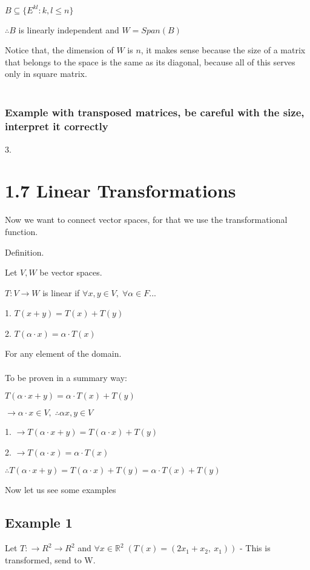 \documentclass{article}
\begin{document}
\(B \subseteq \{E^{kl} : k,l \leq n\}\)

\(\therefore B\) is linearly independent and \(W =Span(B)\)

Notice that, the dimension of \(W\) is \(n\), it makes sense because the size of a matrix that belongs to the space is the same as its diagonal, because all of this serves only in square matrix.
\\
\\
\subsubsection*{Example with transposed matrices, be careful with the size, interpret it correctly}
3. 


\section*{1.7 Linear Transformations}
Now we want to connect vector spaces, for that we use the transformational function.

Definition. 

Let \(V, W\) be vector spaces.

\(T:V\rightarrow W\) is linear if \(\forall x,y \in V,\;\forall\alpha \in F\)...

1. \(T(x+y) = T(x) + T(y)\)

2. \(T(\alpha\cdot x) = \alpha \cdot T(x)\)

For any element of the domain.
\\
\\
To be proven in a summary way:

\(T(\alpha \cdot x + y) = \alpha \cdot T(x) + T(y)\)

\(\rightarrow \alpha \cdot x \in V,\; \therefore \alpha x, y \in V\)

1. \(\rightarrow T(\alpha \cdot x + y) = T(\alpha \cdot x) + T(y)\)

2. \(\rightarrow T(\alpha \cdot x) = \alpha \cdot T(x)\)

\(\therefore T(\alpha \cdot x + y) = T(\alpha \cdot x) + T(y) = \alpha \cdot T(x) + T(y)\)

Now let us see some examples

\subsection{Example 1}

Let \(T : \rightarrow R^{2} \rightarrow R^{2}\) and \(\forall x \in \mathbb{R}^{2}\;(T(x) = (2x_1 + x_2 ,\:x_1))\) - This is transformed, send to W.
\end{document}
